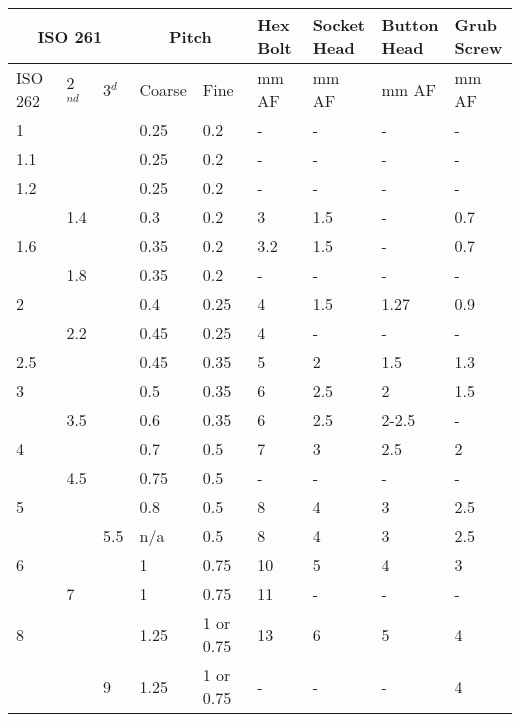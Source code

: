 \begin{table}[h!]
    \footnotesize
\begin{longtable}{lll|ll|llll}
	\multicolumn{3}{c}{ISO 261}
    &\multicolumn{2}{c}{Pitch}
    &\specialcell{Hex\\Bolt}
    &\specialcell{Socket\\Head}
    &\specialcell{Button\\Head}
    &\specialcell{Grub\\Screw}
    \\
\hline
	ISO 262
    &2$^{nd}$
    &3$^{d}$
    &Coarse
    &Fine
    & mm AF
    & mm AF
    & mm AF
    & mm AF
    \\
\hline
    1   &    &    &0.25 &0.2        &-   &-      &-      &-    \\
    1.1 &    &    &0.25 &0.2        &-   &-      &-      &-    \\
    1.2 &    &    &0.25 &0.2        &-   &-      &-      &-    \\
        &1.4 &    &0.3  &0.2        &3   &1.5    &-      &0.7 \\
    1.6 &    &    &0.35 &0.2        &3.2 &1.5    &-      &0.7 \\
        &1.8 &    &0.35 &0.2        &-   &-      &-      &-    \\
    2   &    &    &0.4  &0.25       &4   &1.5    &1.27   &0.9 \\
        &2.2 &    &0.45 &0.25       &4   &-      &-      &- \\
    2.5 &    &    &0.45 &0.35       &5   &2      &1.5    &1.3 \\
    3   &    &    &0.5  &0.35       &6   &2.5    &2      &1.5 \\
        &3.5 &    &0.6  &0.35       &6   &2.5    &2-2.5  &-    \\
    4   &    &    &0.7  &0.5        &7   &3      &2.5    &2 \\
        &4.5 &    &0.75 &0.5        &-   &-      &-      &- \\
    5   &    &    &0.8  &0.5        &8   &4      &3      &2.5 \\
        &    &5.5 &n/a  &0.5        &8   &4      &3      &2.5 \\
    6   &    &    &1    &0.75       &10  &5      &4      &3 \\
        &7   &    &1    &0.75       &11  &-      &-      &-    \\
    8   &    &    &1.25 &1 or 0.75  &13  &6      &5      &4 \\
        &    &9   &1.25 &1 or 0.75  &-   &-      &-      &4 \\

\end{longtable}
\end{table}
